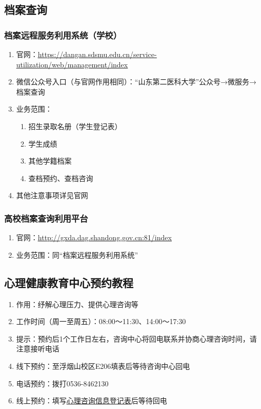 \subsection[档案查询]{档案查询}
\subsubsection[档案远程服务利用系统（学校）]{档案远程服务利用系统（学校）}
\begin{enumerate}
    \item 官网：\uline{\href{https://dangan.sdsmu.edu.cn/service-utilization/web/management/index}{https://dangan.sdsmu.edu.cn/service-utilization/web/management/index}}
    \item 微信公众号入口（与官网作用相同）：“山东第二医科大学”公众号→微服务→档案查询
    \item 业务范围：
          \begin{enumerate}
              \item 招生录取名册（学生登记表）
              \item 学生成绩
              \item 其他学籍档案
              \item 查档预约、查档咨询
          \end{enumerate}
    \item 其他注意事项详见官网
\end{enumerate}
\subsubsection[高校档案查询利用平台]{高校档案查询利用平台}
\begin{enumerate}
    \item 官网：\uline{\href{http://gxda.dag.shandong.gov.cn:81/index}{http://gxda.dag.shandong.gov.cn:81/index}}
    \item 业务范围：同“档案远程服务利用系统”
\end{enumerate}

\subsection[心理健康教育中心预约教程]{心理健康教育中心预约教程}
\begin{enumerate}
    \item 作用：纾解心理压力、提供心理咨询等
    \item 工作时间（周一至周五）：08:00～11:30、14:00～17:30
    \item 提示：预约后1个工作日左右，咨询中心将回电联系并协商心理咨询时间，请注意接听电话
    \item 线下预约：至浮烟山校区E206填表后等待咨询中心回电
    \item 电话预约：拨打0536-8462130
    \item 线上预约：填写\uline{\href{https://www.wjx.cn/vm/YOHd59S.aspx}{心理咨询信息登记表}}后等待回电

\end{enumerate}

